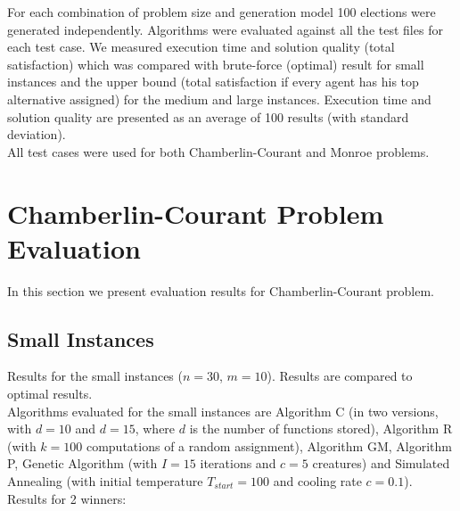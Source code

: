 For each combination of problem size and generation model 100 elections were generated independently. Algorithms were evaluated against all the test files for each test case. We measured execution time and solution quality (total satisfaction) which was compared with brute-force (optimal) result for small instances and the upper bound (total satisfaction if every agent has his top alternative assigned) for the medium and large instances. Execution time and solution quality are presented as an average of 100 results (with standard deviation).
\\

All test cases were used for both Chamberlin-Courant and Monroe problems.

\newpage

\section{Chamberlin-Courant Problem Evaluation}

In this section we present evaluation results for Chamberlin-Courant problem.

\subsection{Small Instances}

Results for the small instances ($n = 30$, $m = 10$). Results are compared to optimal results.
\\

Algorithms evaluated for the small instances are Algorithm C (in two versions, with $d = 10$ and $d = 15$, where $d$ is the number of functions stored), Algorithm R (with $k = 100$ computations of a random assignment), Algorithm GM, Algorithm P, Genetic Algorithm (with $I = 15$ iterations and $c = 5$ creatures) and Simulated Annealing (with initial temperature $T_{start} = 100$ and cooling rate $c = 0.1$).
\\

Results for 2 winners:
\\


